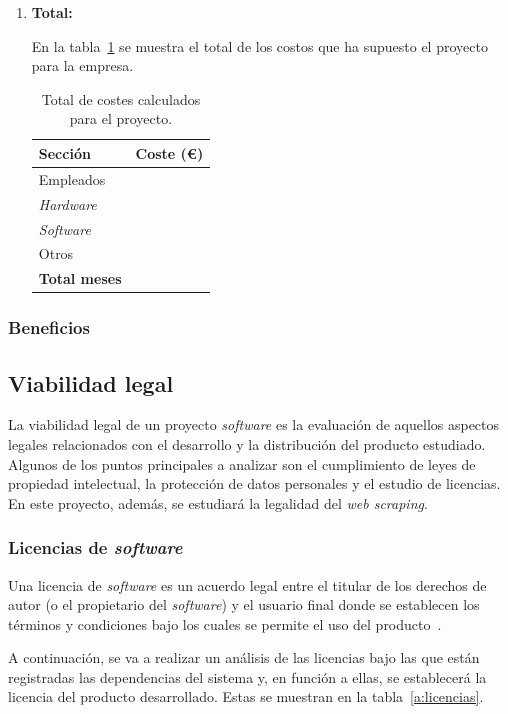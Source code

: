\begin{enumerate}
\item\textbf{Total:}

En la tabla~\ref{a:costes} se muestra el total de los costos que ha supuesto el proyecto para la empresa.

\begin{table}[p]
	\centering
	\begin{tabular}{l r}
		\toprule
		\textbf{Sección} & \textbf{Coste (€)} \\
		\midrule
		Empleados & \\
		\textit{Hardware} & \\
		\textit{Software} & \\
		Otros & \\
		\midrule
		\textbf{Total meses} & \\
		\bottomrule
	\end{tabular}
	\caption[Costes: total]{Total de costes calculados para el proyecto.}
	\label{a:costes}
\end{table}
\end{enumerate}

\subsubsection{Beneficios}

\subsection{Viabilidad legal}
\label{s:vl}

La viabilidad legal de un proyecto \textit{software} es la evaluación de aquellos aspectos legales relacionados con el desarrollo y la distribución del producto estudiado. Algunos de los puntos principales a analizar son el cumplimiento de leyes de propiedad intelectual, la protección de datos personales y el estudio de licencias. En este proyecto, además, se estudiará la legalidad del \textit{web scraping}.

\subsubsection{Licencias de \textit{software}}

Una licencia de \textit{software} es un acuerdo legal entre el titular de los derechos de autor (o el propietario del \textit{software}) y el usuario final donde se establecen los términos y condiciones bajo los cuales se permite el uso del producto~\cite{licenciaQueEs}.

A continuación, se va a realizar un análisis de las licencias bajo las que están registradas las dependencias del sistema y, en función a ellas, se establecerá la licencia del producto desarrollado. Estas se muestran en la tabla~\ref{a:licencias}.

